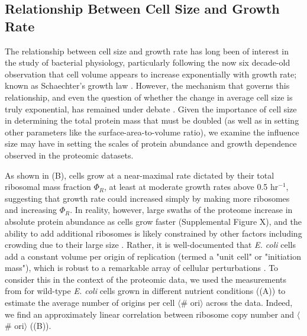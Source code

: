 
\subsection{Relationship Between Cell Size and Growth Rate}
The relationship between cell size and growth rate has long been of interest
in the study of bacterial physiology, particularly following the now six
decade-old observation that cell volume appears to increase exponentially
with growth rate; known as Schaechter's growth law \citep{schaechter1958,
taheriaraghi2015}. However, the mechanism that governs this relationship, and
even the question of whether the change in average cell size is truly
exponential, has remained under debate \citep{harris2018}. Given the
importance of cell size in determining the total protein mass that must be
doubled (as well as in setting other parameters like the
surface-area-to-volume ratio), we examine the influence size may have in
setting the scales of protein abundance and growth dependence observed in the
proteomic datasets.

As shown in (B), cells grow at a near-maximal rate
dictated by their total ribosomal mass fraction $\Phi_R$, at least at
moderate growth rates above 0.5 hr$^{-1}$, suggesting that growth rate could
increased simply by making more ribosomes and increasing $\Phi_R$. In
reality, however, large swaths of the proteome increase in absolute protein
abundance as cells grow faster (Supplemental Figure X), and the ability to
add additional ribosomes is likely constrained by other factors including
crowding due to their large size \citep{delarue2018, solerbistue2020}.
Rather, it is well-documented that \textit{E. coli} cells add a constant
volume per origin of replication (termed a "unit cell" or "initiation mass"),
which is robust to a remarkable array of cellular perturbations
\citep{si2017}. To consider this in the context of the proteomic data, we
used the measurements from \cite{si2017} for wild-type \textit{E. coli} cells
grown in different nutrient conditions ((A)) to
estimate the average number of origins per cell $\langle$\# ori$\rangle$
across the data. Indeed, we find an approximately linear correlation between
ribosome copy number and $\langle$\# ori$\rangle$ ((B)).

